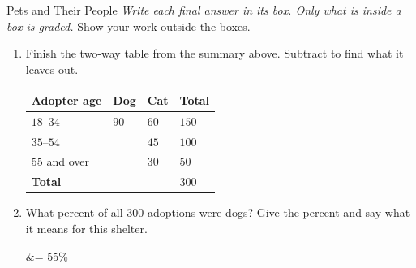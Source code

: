 \documentclass[12pt]{article}
\begin{document}
\boxguard
\begin{notesbox}{Pets and Their People}
\small
\textit{Write each final answer in its box. Only what is inside a box is graded.} Show your work
outside the boxes.
\begin{enumerate}[leftmargin=1.6em, itemsep=6pt, topsep=3pt]

  \item Finish the two-way table from the summary above. Subtract to find what it leaves out.

        \begin{center}
        \renewcommand{\arraystretch}{1.5}
        \begin{tabularx}{0.82\linewidth}{@{} l Y Y Y @{}}
        \toprule
        \textbf{Adopter age} & \textbf{Dog} & \textbf{Cat} & \textbf{Total} \\
        \midrule
        $18$--$34$ & $90$ & $60$ & $150$ \\
        $35$--$54$ &  & $45$ & $100$ \\
        $55$ and over &  & $30$ & $50$ \\
        \textbf{Total} &  &  & $300$ \\
        \bottomrule
        \end{tabularx}
        \end{center}

  \item What percent of all $300$ adoptions were dogs? Give the percent and say what it means
        for this shelter.

        \begin{work}
           &= 55\%
        \end{work}

        \gradedresponse{\gradedblank[id=q2, type=rubric, points=2, display={55\%. Of the 300 pets adopted from the shelter last year, 55\% were dogs. This is a marginal relative frequency: the whole is every adoption.}]{\linewidth}{2in}}

\end{enumerate}
\end{notesbox}
\end{document}
